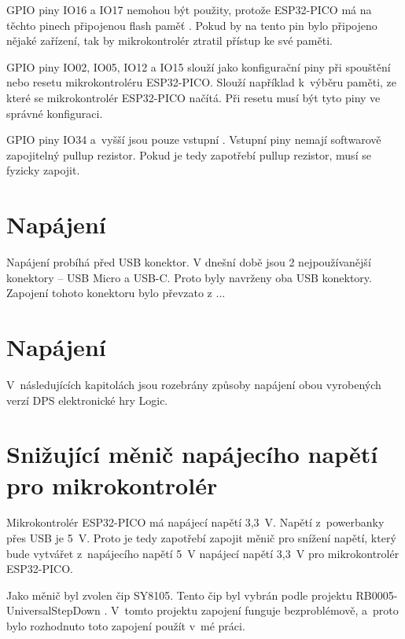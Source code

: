   GPIO piny IO16 a IO17 nemohou být použity, protože ESP32-PICO má na těchto pinech připojenou flash paměť \cite{PICO_datasheet}.
  Pokud by na tento pin bylo připojeno nějaké zařízení, tak by mikrokontrolér ztratil přístup ke své paměti.

  GPIO piny IO02, IO05, IO12 a IO15 slouží jako konfigurační piny při spouštění nebo resetu mikrokontroléru ESP32-PICO. Slouží například k~výběru
  paměti, ze které se mikrokontrolér ESP32-PICO načítá. Při resetu musí být tyto piny ve správné konfiguraci. 

   
  GPIO piny IO34 a~vyšší jsou pouze vstupní \cite{PICO_datasheet}. Vstupní piny nemají softwarově zapojitelný pullup rezistor. 
  Pokud je tedy zapotřebí pullup rezistor, musí se fyzicky zapojit.
  
  \section{Napájení}
  Napájení probíhá před USB konektor. V dnešní době jsou 2 nejpoužívanější konektory – USB Micro a USB-C. Proto byly navrženy oba USB konektory. 
  Zapojení tohoto konektoru bylo převzato z ...%

  \section{Napájení} %
  V~následujících kapitolách jsou rozebrány způsoby napájení obou vyrobených verzí DPS elektronické hry Logic.

  \section{Snižující měnič napájecího napětí pro mikrokontrolér}
  Mikrokontrolér ESP32-PICO má napájecí napětí 3,3~V. Napětí z~powerbanky přes USB je 5~V. Proto je tedy zapotřebí zapojit 
  měnič pro snížení napětí, který bude vytvářet z~napájecího napětí 5~V napájecí napětí 3,3~V pro mikrokontrolér ESP32-PICO.

  Jako měnič byl zvolen čip SY8105. Tento čip byl vybrán podle projektu RB0005-UniversalStepDown \cite{UniversalStepDown}. 
  V~tomto projektu zapojení funguje bezproblémově, a~proto bylo rozhodnuto toto zapojení použít v~mé práci. 

